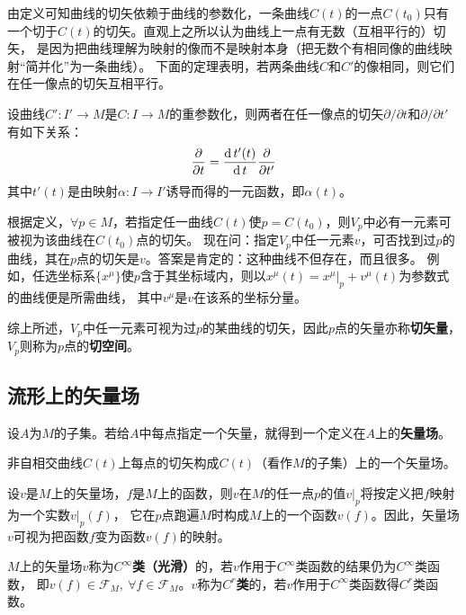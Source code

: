 由定义可知曲线的切矢依赖于曲线的参数化，一条曲线$C(t)$的一点$C(t_0)$只有一个切于$C(t)$的切矢。直观上之所以认为曲线上一点有无数（互相平行的）切矢，
是因为把曲线理解为映射的像而不是映射本身（把无数个有相同像的曲线映射``简并化''为一条曲线）。
下面的定理表明，若两条曲线$C$和$C'$的像相同，则它们在任一像点的切矢互相平行。

\begin{theorem}
设曲线$C' \colon I' \to M$是$C \colon I \to M$的重参数化，则两者在任一像点的切矢$\partial / \partial t$和$\partial / \partial t'$有如下关系：
$$\frac{\partial}{\partial t} = \frac{\operatorname{d} t'(t)}{\operatorname{d} t}\frac{\partial}{\partial t'}$$
其中$t'(t)$是由映射$\alpha \colon I \to I'$诱导而得的一元函数，即$\alpha(t)$。
\end{theorem}

根据定义，$\forall p \in M$，若指定任一曲线$C(t)$使$p = C(t_0)$，则$V_p$中必有一元素可被视为该曲线在$C(t_0)$点的切矢。
现在问：指定$V_p$中任一元素$v$，可否找到过$p$的曲线，其在$p$点的切矢是$v$。答案是肯定的：这种曲线不但存在，而且很多。
例如，任选坐标系$\{x^\mu\}$使$p$含于其坐标域内，则以$x^\mu(t) = x^\mu|_p + v^\mu(t)$为参数式的曲线便是所需曲线，
其中$v^\mu$是$v$在该系的坐标分量。

综上所述，$V_p$中任一元素可视为过$p$的某曲线的切矢，因此$p$点的矢量亦称\textbf{切矢量}，$V_p$则称为$p$点的\textbf{切空间}。

\subsection{流形上的矢量场}

\begin{definition}
设$A$为$M$的子集。若给$A$中每点指定一个矢量，就得到一个定义在$A$上的\textbf{矢量场}。
\end{definition}

\begin{example}
非自相交曲线$C(t)$上每点的切矢构成$C(t)$（看作$M$的子集）上的一个矢量场。
\end{example}

设$v$是$M$上的矢量场，$f$是$M$上的函数，则$v$在$M$的任一点$p$的值$v|_p$将按定义把$f$映射为一个实数$v|_p(f)$，
它在$p$点跑遍$M$时构成$M$上的一个函数$v(f)$。因此，矢量场$v$可视为把函数$f$变为函数$v(f)$的映射。

\begin{definition}
$M$上的矢量场$v$称为\textbf{$C^\infty$类（光滑）}的，若$v$作用于$C^\infty$类函数的结果仍为$C^\infty$类函数，
即$v(f) \in \mathscr{F}_M, ~ \forall f \in \mathscr{F}_M$。$v$称为\textbf{$C^r$类}的，若$v$作用于$C^\infty$类函数得$C^r$类函数。
\end{definition}


